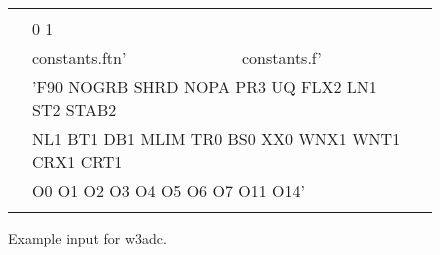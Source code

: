 \setlength{\unitlength}{0.1mm}

\begin{figure}

\begin{center} {\code \begin{tabular}{|cllc|} \hline
 & & &  \\
 & \multicolumn{2}{l}{0 1}        & \\ 
 & constants.ftn' & constants.f'  & \\
 & \multicolumn{2}{l}{'F90 NOGRB SHRD NOPA PR3 UQ FLX2 LN1 ST2 STAB2}& \\
 & \multicolumn{2}{l}{\strut\hspace{5mm} NL1 BT1 DB1 MLIM TR0 BS0 XX0 WNX1 WNT1 CRX1 CRT1 }& \\
 & \multicolumn{2}{l}{\strut\hspace{5mm} O0 O1 O2 O3 O4 O5 O6 O7 O11 O14'}& \\
 &               &             & \\ \hline
\end{tabular} } \end{center} 
\caption{Example input for {\F w3adc}.} \label{fig:w3adc}

\botline
\end{figure}
